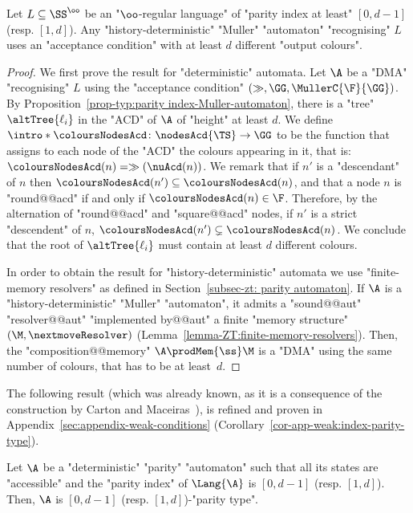 \documentclass{theoretics}
\begin{document}
\begin{proposition}\label{prop-typ:min-colours-Muller-automata}
	Let $L\subseteq \SS^\oo$ be an "$\oo$-regular language" of "parity index at least" $[0,d-1]$ (resp. $[1,d]$). Any "history-deterministic" "Muller" "automaton" "recognising" $L$ uses an "acceptance condition" with at least $d$ different "output colours". 
\end{proposition}
\begin{proof}
	We first prove the result for "deterministic" automata. Let $\A$ be a "DMA" "recognising" $L$ using the "acceptance condition" $(\gg, \GG, \MullerC{\F}{\GG})$. By Proposition~\ref{prop-typ:parity index-Muller-automaton}, there is a "tree" $\altTree{\ell_i}$ in the "ACD" of $\A$ of "height" at least $d$. 
	\AP We define $\intro*\coloursNodesAcd\colon \nodesAcd{\TS} \to \GG$ to be the function that assigns to each node of the "ACD" the colours appearing in it, that is: $\coloursNodesAcd(n) = \gg(\nuAcd(n))$. We remark that if $n'$ is a "descendant" of $n$ then $\coloursNodesAcd(n')\subseteq \coloursNodesAcd(n)$, and that a node $n$ is "round@@acd" if and only if $\coloursNodesAcd(n)\in \F$. Therefore, by the alternation of "round@@acd" and "square@@acd" nodes, if $n'$ is a strict "descendent" of $n$, $\coloursNodesAcd(n')\subsetneq \coloursNodesAcd(n)$. We conclude that the root of $\altTree{\ell_i}$ must contain at least $d$ different colours.
	
	In order to obtain the result for "history-deterministic" automata we use "finite-memory resolvers" as defined in Section~\ref{subsec-zt: parity automaton}. If $\A$ is a "history-deterministic" "Muller" "automaton", it admits a "sound@@aut" "resolver@@aut" "implemented by@@aut" a finite "memory structure" $(\M, \nextmoveResolver)$ (Lemma~\ref{lemma-ZT:finite-memory-resolvers}). Then, the "composition@@memory" $\A \prodMem{\ss} \M$ is a "DMA" using the same number of colours, that has to be at least~$d$.
\end{proof}

The following result (which was already known, as it is a consequence of the construction by Carton and Maceiras~\cite{CartonMaceiras99RabinIndex}), is refined and proven in Appendix~\ref{sec:appendix-weak-conditions} (Corollary~\ref{cor-app-weak:index-parity-type}).
\begin{proposition}
	Let $\A$ be a "deterministic" "parity" "automaton" such that all its states are "accessible" and the "parity index" of $\Lang{\A}$ is $[0,d-1]$ (resp. $[1,d]$). 
	Then, $\A$ is $[0,d-1]$ (resp. $[1,d]$)-"parity type". 
\end{proposition}
\end{document}

